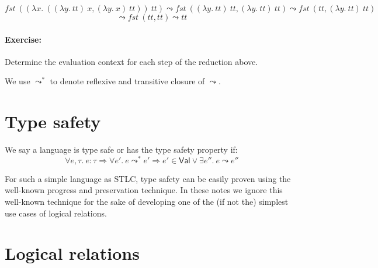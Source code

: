 \documentclass{article}
\newcommand{\fst}{\mathit{fst}}
\newcommand{\TT}{\mathit{tt}}
\newcommand{\VAL}{\mathsf{Val}}
\begin{document}
\[
\fst~((\lambda x.~((\lambda y.~ \TT)~x, (\lambda y.~ x)~\TT))~\TT) \leadsto
\fst~((\lambda y.~ \TT)~\TT, (\lambda y.~ \TT)~\TT) \leadsto
\fst~(\TT, (\lambda y.~ \TT)~\TT)
\]
\[
\leadsto \fst~(\TT, \TT) \leadsto \TT
\]

\paragraph{Exercise:} Determine the evaluation context for each step of the reduction above.

We use $\leadsto^*$ to denote reflexive and transitive closure of $\leadsto$.

\section{Type safety}
We say a language is type safe or has the type safety property if:
\[
\forall e, \tau.~e : \tau \Rightarrow \forall e'.~ e \leadsto^* e'
\Rightarrow e' \in \VAL \lor \exists e''.~e\leadsto e''
\]

For such a simple language as STLC, type safety can be easily proven using the well-known progress and preservation technique. In these notes we ignore this well-known technique for the sake of developing one of the (if not the) simplest use cases of logical relations.

\section{Logical relations}
\end{document}
